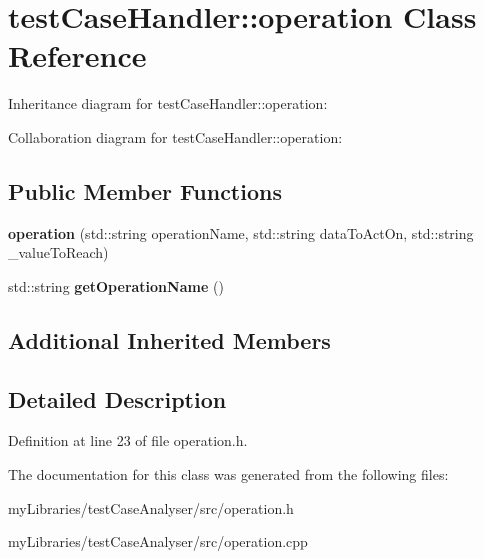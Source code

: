 \hypertarget{classtestCaseHandler_1_1operation}{}\section{test\+Case\+Handler\+::operation Class Reference}
\label{classtestCaseHandler_1_1operation}


Inheritance diagram for test\+Case\+Handler\+::operation\+:


Collaboration diagram for test\+Case\+Handler\+::operation\+:
\subsection*{Public Member Functions}
\begin{DoxyCompactItemize}
\item 
\mbox{\label{classtestCaseHandler_1_1operation_ac76942352994b011aefedc6220d9bb5a}} 
{\bfseries operation} (std\+::string operation\+Name, std\+::string data\+To\+Act\+On, std\+::string \+\_\+value\+To\+Reach)
\item 
\mbox{\label{classtestCaseHandler_1_1operation_a5c99a1a24b5ee9c13bb4035e084a7ce1}} 
std\+::string {\bfseries get\+Operation\+Name} ()
\end{DoxyCompactItemize}
\subsection*{Additional Inherited Members}


\subsection{Detailed Description}


Definition at line 23 of file operation.\+h.



The documentation for this class was generated from the following files\+:\begin{DoxyCompactItemize}
\item 
my\+Libraries/test\+Case\+Analyser/src/operation.\+h\item 
my\+Libraries/test\+Case\+Analyser/src/operation.\+cpp\end{DoxyCompactItemize}
